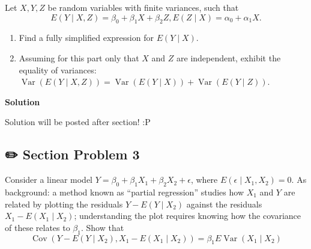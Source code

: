 \documentclass[
  letterpaper,
  DIV=11,
  numbers=noendperiod]{scrreprt}
\theoremstyle{plain}
\theoremstyle{definition}
\theoremstyle{remark}
\begin{document}
Let \(X, Y, Z\) be random variables with finite variances, such that \[
E(Y \mid X, Z)=\beta_0+\beta_1 X+\beta_2 Z, E(Z \mid X)=\alpha_0+\alpha_1 X .
\]

\begin{enumerate}
\def\labelenumi{(\alph{enumi})}
\item
  Find a fully simplified expression for \(E(Y \mid X)\).
\item
  Assuming for this part only that \(X\) and \(Z\) are independent,
  exhibit the equality of variances:
  \(\operatorname{Var}(E(Y \mid X, Z))=\operatorname{Var}(E(Y \mid X))+\operatorname{Var}(E(Y \mid Z))\).
\end{enumerate}

\begin{tcolorbox}[enhanced jigsaw, arc=.35mm, colframe=quarto-callout-tip-color-frame, left=2mm, rightrule=.15mm, bottomrule=.15mm, colback=white, toprule=.15mm, opacityback=0, leftrule=.75mm, breakable]
\begin{minipage}[t]{5.5mm}
\textcolor{quarto-callout-tip-color}{\faLightbulb}
\end{minipage}%
\begin{minipage}[t]{\textwidth - 5.5mm}

\textbf{Solution}\vspace{2mm}

Solution will be posted after section! :P

\end{minipage}%
\end{tcolorbox}

\hypertarget{section-problem-3-4}{%
\subsection*{✏️ Section Problem 3}\label{section-problem-3-4}}

Consider a linear model \(Y=\beta_0+\beta_1 X_1+\beta_2 X_2+\epsilon\),
where \(E\left(\epsilon \mid X_1, X_2\right)=0\). As background: a
method known as ``partial regression'' studies how \(X_1\) and \(Y\) are
related by plotting the residuals \(Y-E\left(Y \mid X_2\right)\) against
the residuals \(X_1-E\left(X_1 \mid X_2\right)\); understanding the plot
requires knowing how the covariance of these relates to \(\beta_1\).
Show that \[
\operatorname{Cov}\left(Y-E\left(Y \mid X_2\right), X_1-E\left(X_1 \mid X_2\right)\right)=\beta_1 E \operatorname{Var}\left(X_1 \mid X_2\right)
\]
\end{document}
